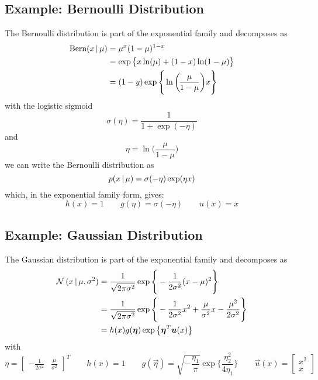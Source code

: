 		\subsection{Example: Bernoulli Distribution}
			The Bernoulli distribution is part of the exponential family and decomposes as
			\begin{align}
				\textrm{Bern}(x \,\vert\, \mu) &= \mu^x (1 - \mu)^{1 - x} \\
					&= \exp \big\{ x \ln(\mu) + (1 - x) \ln(1 - \mu) \big\} \\
					&= (1 - y) \exp \Bigg\{ \ln\bigg(\!\frac{\mu}{1 - \mu} \bigg) x \Bigg\}
			\end{align}
			with the logistic sigmoid
			\begin{equation}
				\sigma(\eta) = \frac{1}{1 + \exp(-\eta)}
			\end{equation}
			and
			\begin{equation}
				\eta = \ln\bigg(\!\frac{\mu}{1 - \mu} \bigg)
			\end{equation}
			we can write the Bernoulli distribution as
			\begin{equation}
				p(x \,\vert\, \mu) = \sigma(-\eta) \exp(\eta x)
			\end{equation}
			which, in the exponential family form, gives:
			\begin{equation}
				h(x) = 1 \qquad g(\eta) = \sigma(-\eta) \qquad u(x) = x
			\end{equation}

		\subsection{Example: Gaussian Distribution}
			The Gaussian distribution is part of the exponential family and decomposes as
			\begin{align}
				\mathcal{N}\,(x \,\vert\, \mu, \sigma^2) &= \frac{1}{\sqrt{2\pi\sigma^2}} \exp\Bigg\{ -\frac{1}{2\sigma^2} (x - \mu)^2 \Bigg\} \\
					&= \frac{1}{\sqrt{2\pi\sigma^2}} \exp\Bigg\{ -\frac{1}{2\sigma^2} x^2 + \frac{\mu}{\sigma^2} x - \frac{\mu^2}{2\sigma^2} \Bigg\} \\
					&= h(x) g(\bm{\eta}) \exp\big\{ \bm{\eta}^T \bm{u}(x) \big\}
			\end{align}
			with
			\begin{equation}
				\eta = \begin{bmatrix} -\frac{1}{2\sigma^2} & \frac{\mu}{\sigma^2} \end{bmatrix}^T \qquad h(x) = 1 \qquad g(\vec{\eta}) = \sqrt{-\frac{\eta_1}{\pi}} \exp \Bigg\{ \frac{\eta_2^2}{4\eta_1} \Bigg\} \qquad \vec{u}(x) = \begin{bmatrix} x^2 \\ x \end{bmatrix}
			\end{equation}

